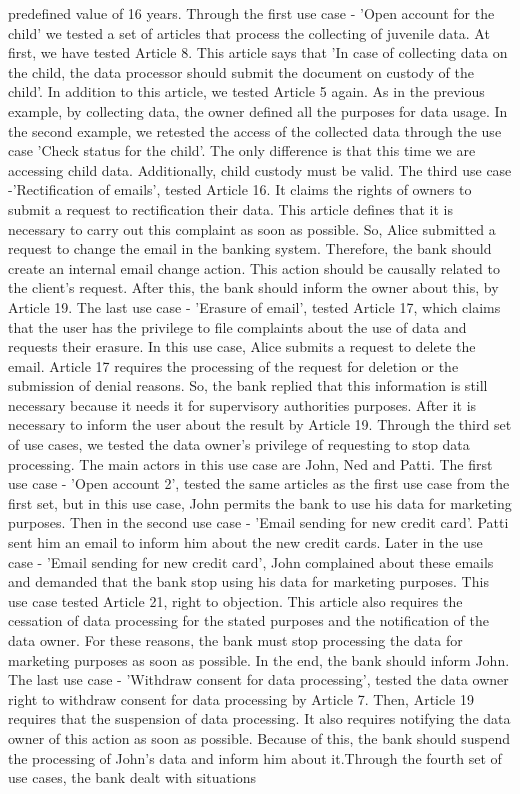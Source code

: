 \documentclass[11pt,english]{article}
\begin{document}
predefined value of 16 years. Through the first use case - 'Open account for the child' we tested a set of articles that process the collecting of juvenile data. At first, we have tested Article 8. This article says that 'In case of collecting data on the child, the data processor should submit the document on custody of the child'. In addition to this article, we tested Article 5 again. As in the previous example, by collecting data, the owner defined all the purposes for data usage. In the second example, we retested the access of the collected data through the use case 'Check status for the child'. The only difference is that this time we are accessing child data. Additionally, child custody must be valid. The third use case -'Rectification of emails', tested Article 16. It claims the rights of owners to submit a request to rectification their data. This article defines that it is necessary to carry out this complaint as soon as possible. So, Alice submitted a request to change the email in the banking system. Therefore, the bank should create an internal email change action. This action should be causally related to the client's request. After this, the bank should inform the owner about this, by Article 19. The last use case - 'Erasure of email', tested Article 17, which claims that the user has the privilege to file complaints about the use of data and requests their erasure. In this use case, Alice submits a request to delete the email. Article 17 requires the processing of the request for deletion or the submission of denial reasons. So, the bank replied that this information is still necessary because it needs it for supervisory authorities purposes. After it is necessary to inform the user about the result by Article 19. \newline Through the third set of use cases, we tested the data owner's privilege of requesting to stop data processing. The main actors in this use case are John, Ned and Patti. The first use case - 'Open account 2', tested the same articles as the first use case from the first set, but in this use case, John permits the bank to use his data for marketing purposes. Then in the second use case - 'Email sending for new credit card'. Patti sent him an email to inform him about the new credit cards. Later in the use case - 'Email sending for new credit card', John complained about these emails and demanded that the bank stop using his data for marketing purposes. This use case tested Article 21, right to objection. This article also requires the cessation of data processing for the stated purposes and the notification of the data owner. For these reasons, the bank must stop processing the data for marketing purposes as soon as possible. In the end, the bank should inform John. The last use case - 'Withdraw consent for data processing', tested the data owner right to withdraw consent for data processing by Article 7. Then, Article 19 requires that the suspension of data processing. It also requires notifying the data owner of this action as soon as possible. Because of this, the bank should suspend the processing of John's data and inform him about it.\newline Through the fourth set of use cases, the bank dealt with situations 
\end{document}
